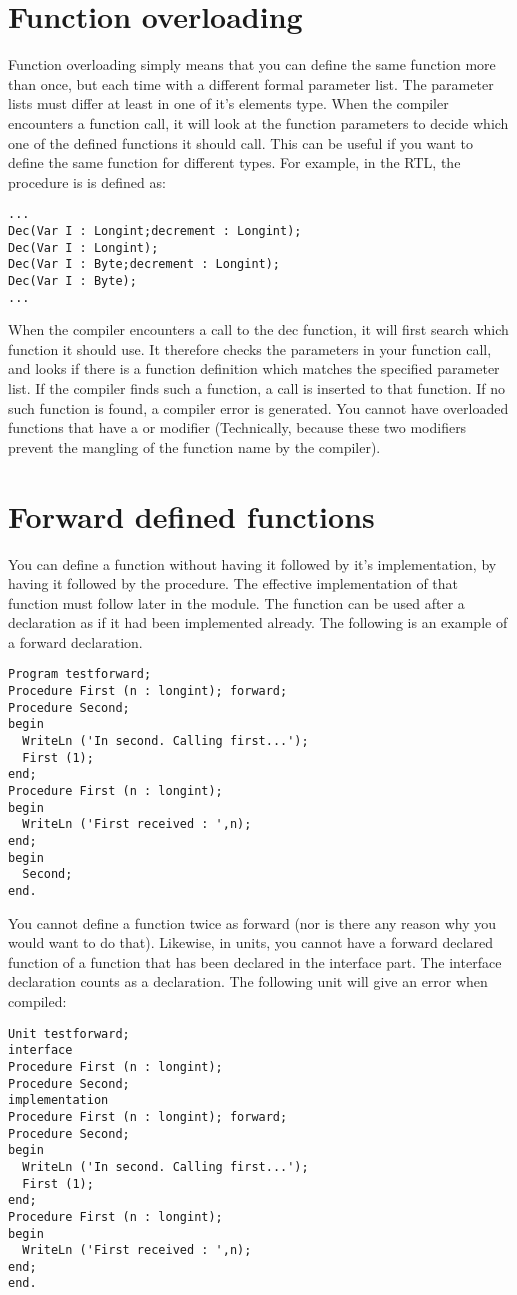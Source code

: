 \documentclass{report}
\begin{document}
\section{Function overloading}
Function overloading simply means that you can define the same function more
than once, but each time with a different formal parameter list.
The parameter lists must differ at least in one of it's elements type.
When the compiler encounters a function call, it will look at the function
parameters to decide which one of the defined functions it should call.
This can be useful if you want to define the same function for different
types. For example, in the RTL, the   procedure is
is defined as:
\begin{verbatim}
...
Dec(Var I : Longint;decrement : Longint);
Dec(Var I : Longint);
Dec(Var I : Byte;decrement : Longint);
Dec(Var I : Byte);
...
\end{verbatim}
When the compiler encounters a call to the dec function, it will first search
which function it should use. It therefore checks the parameters in your
function call, and looks if there is a function definition which matches the
specified parameter list. If the compiler finds such a function, a call is
inserted to that function. If no such function is found, a compiler error is
generated.
You cannot have overloaded functions that have a  or 
modifier (Technically, because these two modifiers prevent the mangling of
the function name by the compiler).

\section{Forward defined functions}
You can define a function without having it followed by it's implementation,
by having it followed by the  procedure. The effective
implementation of that function must follow later in the module.
The function can be used after a  declaration as if it had been
implemented already.
The following is an example of a forward declaration.
\begin{verbatim}
Program testforward;
Procedure First (n : longint); forward;
Procedure Second;
begin
  WriteLn ('In second. Calling first...');
  First (1);
end;
Procedure First (n : longint);
begin
  WriteLn ('First received : ',n);
end;
begin
  Second;
end.
\end{verbatim}
You cannot define a function twice as forward (nor is there any reason why
you would want to do that).
Likewise, in units, you cannot have a forward declared function of a
function that has been declared in the interface part. The interface
declaration counts as a  declaration.
The following unit will give an error when compiled:
\begin{verbatim}
Unit testforward;
interface
Procedure First (n : longint);
Procedure Second;
implementation
Procedure First (n : longint); forward;
Procedure Second;
begin
  WriteLn ('In second. Calling first...');
  First (1);
end;
Procedure First (n : longint);
begin
  WriteLn ('First received : ',n);
end;
end.
\end{verbatim}
\end{document}

